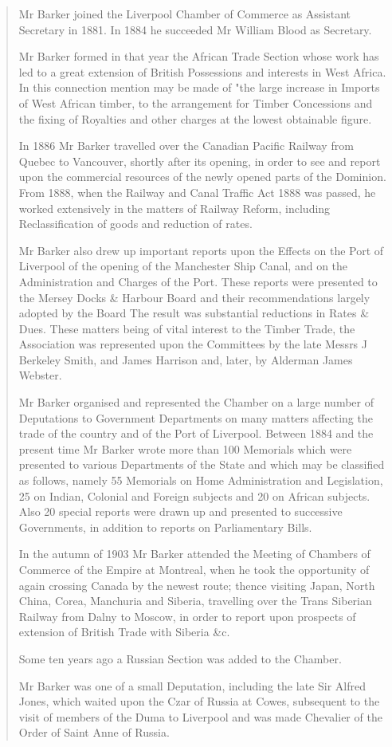 \begin{quotation}
Mr Barker joined the Liverpool Chamber of Commerce as Assistant Secretary in 1881. In 1884 he succeeded Mr William Blood as Secretary.

Mr Barker formed in that year the African Trade Section whose work has led to a great extension of British Possessions and interests in West Africa. In this connection mention may be made of "the large increase in Imports of West African timber, to the arrangement for Timber Concessions and the fixing of Royalties and other charges at the lowest obtainable figure.

In 1886 Mr Barker travelled over the Canadian Pacific Railway from Quebec to Vancouver, shortly after its opening, in order to see and report upon the commercial resources of the newly opened parts of the Dominion. From 1888, when the Railway and Canal Traffic Act 1888 was passed, he worked extensively in the matters of Railway Reform, including Reclassification of goods and reduction of rates.

Mr Barker also drew up important reports upon the Effects on the Port of Liverpool of the opening of the Manchester Ship Canal, and on the Administration and Charges of the Port. These reports were presented to the Mersey Docks \& Harbour Board and their recommendations largely adopted by the Board The result was substantial reductions in Rates \& Dues. These matters being of vital interest to the Timber Trade, the Association was represented upon the Committees by the late Messrs J Berkeley Smith, and James Harrison and, later, by Alderman James Webster.

Mr Barker organised and represented the Chamber on a large number of Deputations to Government Departments on many matters affecting the trade of the country and of the Port of Liverpool. Between 1884 and the present time Mr Barker wrote more than 100 Memorials which were presented to various Departments of the State and which may be classified as follows, namely 55 Memorials on Home Administration and Legislation, 25 on Indian, Colonial and Foreign subjects and 20 on African subjects. Also 20 special reports were drawn up and presented to successive Governments, in addition to reports on Parliamentary Bills.

In the autumn of 1903 Mr Barker attended the Meeting of Chambers of Commerce of the Empire at Montreal, when he took the opportunity of again crossing Canada by the newest route; thence visiting Japan, North China, Corea, Manchuria and Siberia, travelling over the Trans Siberian Railway from Dalny to Moscow, in order to report upon prospects of extension of British Trade with Siberia \&c.

Some ten years ago a Russian Section was added to the Chamber.

Mr Barker was one of a small Deputation, including the late Sir Alfred Jones, which waited upon the Czar of Russia at Cowes, subsequent to the visit of members of the Duma to Liverpool and was made Chevalier of the Order of Saint Anne of Russia.
\end{quotation}

